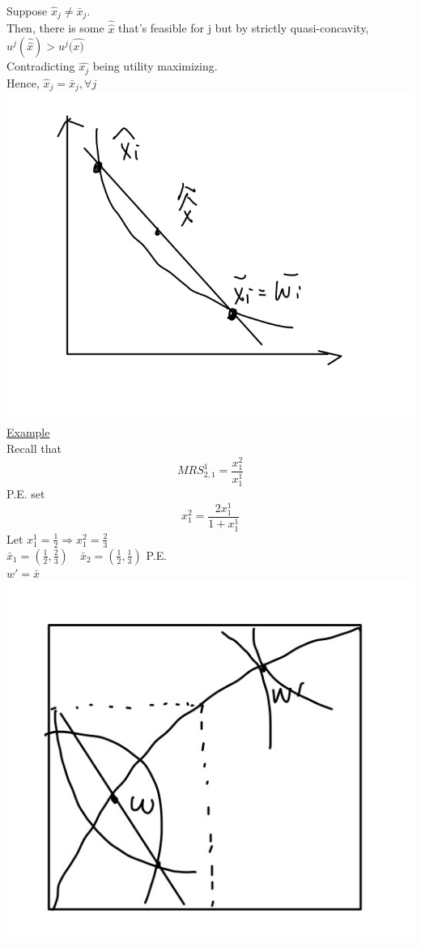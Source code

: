\documentclass[letterpaper,13pt,single,pdftex]{scrartcl}
\begin{document}
Suppose $\hat{x}_j \ne \bar{x}_j$.\\
Then, there is some $\hat{\hat{x}}$ that's feasible for j but by strictly quasi-concavity, $u^j(\hat{\hat{x}})> u^j(\hat{x)}$\\
Contradicting $\hat{x_j}$ being utility maximizing. \\
Hence, $\hat{x}_j = \bar{x}_j, \forall j$\\
\includegraphics[scale = 0.2]{WEA-4.jpg}\\
\underline{Example}\\
Recall that 
\[MRS_{2,1}^1 = \frac{x_1^2}{x_1^1}\]
P.E. set \[x_1^2 = \frac{2x_1^1}{1+x_1^1}\]
Let $x_1^1 = \frac{1}{2} \Rightarrow x_1^2 = \frac{2}{3}$\\
$\bar{x}_1= (\frac{1}{2},\frac{2}{3})\quad \bar{x}_2 = (\frac{1}{2}, \frac{1}{3})$ P.E.\\ $w' = \bar{x}$\\
\includegraphics[scale = 0.3]{WEA-5.jpg}\\
\end{document}

